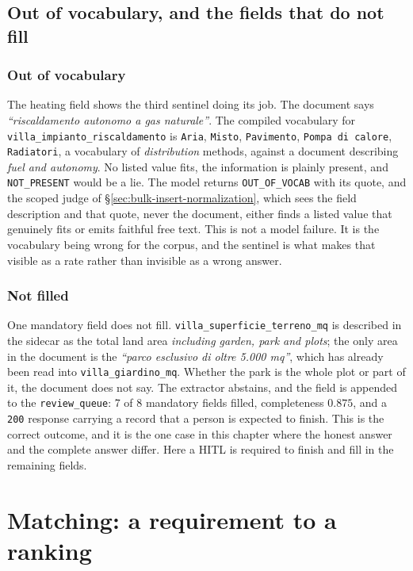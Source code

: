 \subsection{Out of vocabulary, and the fields that do not fill}
\label{sec:examples-oov-queue}

\subsubsection{Out of vocabulary}
The heating field shows the third sentinel doing its job. The document says \emph{``riscaldamento autonomo a gas naturale''}. The compiled vocabulary for \texttt{villa\_impianto\_riscaldamento} is \texttt{Aria}, \texttt{Misto}, \texttt{Pavimento}, \texttt{Pompa di calore}, \texttt{Radiatori}, a vocabulary of \emph{distribution} methods, against a document describing \emph{fuel and autonomy}. No listed value fits, the information is plainly present, and \texttt{NOT\_PRESENT} would be a lie. The model returns \texttt{OUT\_OF\_VOCAB} with its quote, and the scoped judge of \S\ref{sec:bulk-insert-normalization}, which sees the field description and that quote, never the document, either finds a listed value that genuinely fits or emits faithful free text. This is not a model failure. It is the vocabulary being wrong for the corpus, and the sentinel is what makes that visible as a rate rather than invisible as a wrong answer.

\subsubsection{Not filled}
One mandatory field does not fill. \texttt{villa\_superficie\_terreno\_mq} is described in the sidecar as the total land area \emph{including garden, park and plots}; the only area in the document is the \emph{``parco esclusivo di oltre 5.000 mq''}, which has already been read into \texttt{villa\_giardino\_mq}. Whether the park is the whole plot or part of it, the document does not say. The extractor abstains, and the field is appended to the \texttt{review\_queue}: 7 of 8 mandatory fields filled, completeness $0.875$, and a \texttt{200} response carrying a record that a person is expected to finish. This is the correct outcome, and it is the one case in this chapter where the honest answer and the complete answer differ. Here a HITL is required to finish and fill in the remaining fields. 


\section{Matching: a requirement to a ranking}
\label{sec:examples-matching}

